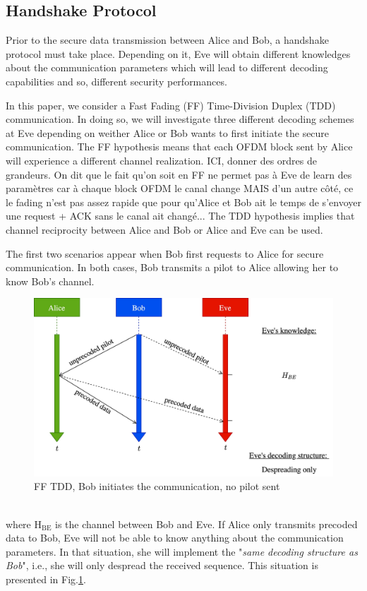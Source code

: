 \documentclass[journal,comsoc]{IEEEtran}
\let\MYoriglatexcaption\caption
\renewcommand{\caption}[2][\relax]{\MYoriglatexcaption[#2]{#2}}
\newcommand{\mat}[1]{\boldsymbol{\mathrm{#1}}}
\begin{document}
\subsection{Handshake Protocol}
\label{sec:establishment}
Prior to the secure data transmission between Alice and Bob, a handshake protocol must take place. Depending on it, Eve will obtain different knowledges about the communication parameters which will lead to different decoding capabilities and so, different security performances. 

In this paper, we consider a Fast Fading (FF) Time-Division Duplex (TDD) communication. In doing so, we will investigate three different decoding schemes at Eve depending on weither Alice or Bob wants to first initiate the secure communication. The FF hypothesis means that each OFDM block sent by Alice will experience a different channel realization. {\color{red}ICI, donner des ordres de grandeurs. On dit que le fait qu'on soit en FF ne permet pas à Eve de learn des paramètres car à chaque block OFDM le canal change MAIS d'un autre côté, ce le fading n'est pas assez rapide que pour qu'Alice et Bob ait le temps de s'envoyer une request + ACK sans le canal ait changé...} The TDD hypothesis implies that channel reciprocity between Alice and Bob or Alice and Eve can be used. 

The first two scenarios appear when Bob first requests to Alice for secure communication. In both cases, Bob transmits a pilot to Alice allowing her to know Bob's channel. \\
\begin{figure}[!ht]
	\centering
	\includegraphics[width=.9\linewidth]{graphs/diagram_sequence-FF_TDD_B_no_pilot.jpg}
	\caption{FF TDD, Bob initiates the communication, no pilot sent}
	\label{fig_ff_tdd_b_no_pilot}
\end{figure} \\
where $\mat{H}_{\text{BE}}$ is the channel between Bob and Eve. If Alice only transmits precoded data to Bob, Eve will not be able to know anything about the communication parameters. In that situation, she will implement the "\textit{same decoding structure as Bob}", i.e., she will only despread the received sequence. This situation is presented in Fig.\ref{fig_ff_tdd_b_no_pilot}.
\end{document}
